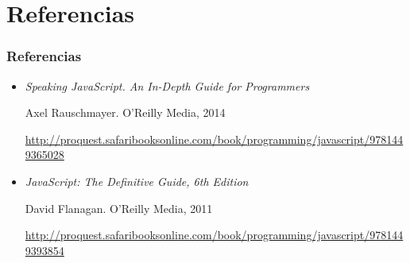 \documentclass[ucs]{beamer}
\begin{document}
\section{Referencias}
\begin{frame}[fragile]
\frametitle{Referencias}
\begin{itemize}
\item
\emph{Speaking JavaScript. An In-Depth Guide for Programmers}

Axel Rauschmayer. O'Reilly Media, 2014


\begin{tiny}
\begin{flushright}
\url{http://proquest.safaribooksonline.com/book/programming/javascript/9781449365028}
\end{flushright}
\end{tiny}

\item
\emph{JavaScript: The Definitive Guide, 6th Edition}

David Flanagan. O'Reilly Media, 2011

\begin{tiny}
\begin{flushright}
\url{http://proquest.safaribooksonline.com/book/programming/javascript/9781449393854}
\end{flushright}
\end{tiny}


\end{itemize}

\end{frame}
\end{document}
